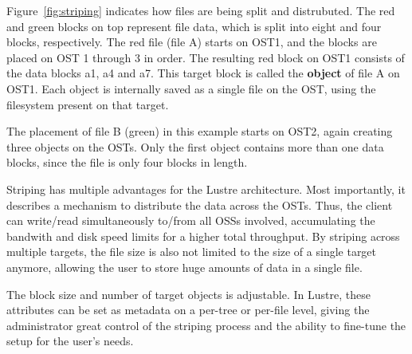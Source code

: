 Figure~\ref{fig:striping} indicates how files are being split and distrubuted.
The red and green blocks on top represent file data, which is split into
eight and four blocks, respectively. The red file (file A) starts on OST1,
and the blocks are placed on OST 1 through 3 in order. The resulting red
block on OST1 consists of the data blocks a1, a4 and a7. This target block
is called the \textbf{object} of file A on OST1. Each object is internally saved
as a single file on the OST, using the filesystem present on that target.

The placement of file B (green) in this example starts on OST2, again creating
three objects on the OSTs. Only the first object contains more than one data
blocks, since the file is only four blocks in length.

Striping has multiple advantages for the Lustre architecture. Most importantly,
it describes a mechanism to distribute the data across the OSTs. Thus, the
client can write/read simultaneously to/from all OSSs involved, accumulating
the bandwith and disk speed limits for a higher total throughput. By striping
across multiple targets, the file size is also not limited to the size of
a single target anymore, allowing the user to store huge amounts of data
in a single file.

The block size and number of target objects is adjustable. In Lustre, these
attributes can be set as metadata on a per-tree or per-file level, giving
the administrator great control of the striping process and the ability to
fine-tune the setup for the user's needs.
